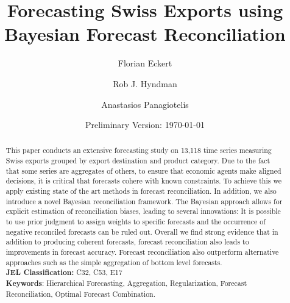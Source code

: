 


\title{\huge Forecasting Swiss Exports using Bayesian Forecast Reconciliation}

\author[$\dagger$]{Florian Eckert}
\author[$\ddagger$]{Rob J. Hyndman}
\author[$\ddagger$]{Anastasios Panagiotelis}
\date{Preliminary Version: \today}

\maketitle
\begin{abstract}
This paper conducts an extensive forecasting study on 13,118 time series measuring Swiss exports grouped by export destination and product category.  Due to the fact that some series are aggregates of others, to ensure that economic agents make aligned decisions, it is critical that forecasts cohere with known constraints.  To achieve this we apply existing state of the art methods in forecast reconciliation.  In addition, we also introduce a novel Bayesian reconciliation framework. The Bayesian approach allows for explicit estimation of reconciliation biases, leading to several innovations: It is possible to use prior judgment to assign weights to specific forecasts and the occurrence of negative reconciled forecasts can be ruled out. Overall we find strong evidence that in addition to producing coherent forecasts, forecast reconciliation also leads to improvements in forecast accuracy.  Forecast reconciliation also outperform alternative approaches such as the simple aggregation of bottom level forecasts.\\

\noindent \textbf{JEL Classification:} C32, C53, E17 \\
\noindent \textbf{Keywords}: Hierarchical Forecasting, Aggregation, Regularization, Forecast Reconciliation, Optimal Forecast Combination.
\end{abstract}
\clearpage









